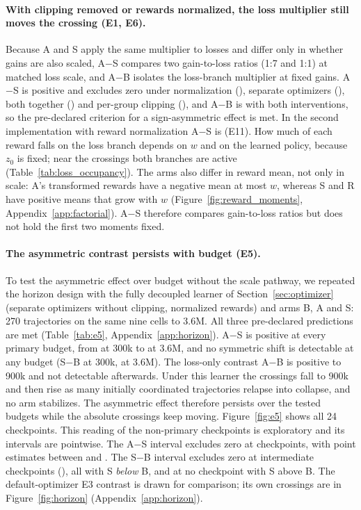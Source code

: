 \paragraph{With clipping removed or rewards normalized, the loss multiplier still moves the crossing (E1, E6).}
Because A and S apply the same multiplier to losses and differ only in whether gains are also scaled, A$-$S
compares two gain-to-loss ratios (1:7 and 1:1) at matched loss scale, and A$-$B isolates the loss-branch
multiplier at fixed gains. A$-$S is positive and excludes zero under normalization (\VfourAsymNorm{}),
separate optimizers (\VfourAsymSep{}), both together (\VfourAsymBoth{}) and per-group clipping
(\VsixAsymGroup{}), and A$-$B is \VfourLossBoth{} with both interventions, so the pre-declared criterion for a
sign-asymmetric effect is met. In the second implementation with reward normalization A$-$S is
\VelevenAsymDefault{} (E11). How much of each reward falls on the loss branch depends on $w$ and on the
learned policy, because $z_0$ is fixed; near the crossings both branches are active
(Table~\ref{tab:loss_occupancy}). The arms also differ in reward mean, not only in scale: A's transformed
rewards have a negative mean at most $w$, whereas S and R have positive means that grow with $w$
(Figure~\ref{fig:reward_moments}, Appendix~\ref{app:factorial}). A$-$S therefore compares gain-to-loss ratios
but does not hold the first two moments fixed.

\paragraph{The asymmetric contrast persists with budget (E5).}
To test the asymmetric effect over budget without the scale pathway, we repeated the horizon design with
the fully decoupled learner of Section~\ref{sec:optimizer} (separate optimizers without clipping,
normalized rewards) and arms B, A and S: 270 trajectories on the same nine cells to 3.6M. All three
pre-declared predictions are met (Table~\ref{tab:e5}, Appendix~\ref{app:horizon}). A$-$S is positive at every primary budget, from
\VfiveAsymStart{} at 300k to \VfiveAsymEnd{} at 3.6M, and no symmetric shift is detectable at any budget
(S$-$B \VfiveSymStart{} at 300k, \VfiveSymEnd{} at 3.6M). The loss-only contrast A$-$B is positive to
900k and not detectable afterwards. Under this learner the crossings fall to 900k and then rise as many
initially coordinated trajectories relapse into collapse, and no arm stabilizes. The asymmetric effect
therefore persists over the tested budgets while the absolute crossings keep moving.
Figure~\ref{fig:e5} shows all 24 checkpoints. This reading of the non-primary checkpoints is exploratory
and its intervals are pointwise. The A$-$S interval excludes zero at \VrevAsymPos{} checkpoints, with
point estimates between \VrevAsymMin{} and \VrevAsymMax{}. The S$-$B interval excludes zero at
\VrevSymNeg{} intermediate checkpoints (\VrevSymNegSpan{}), all with S \emph{below} B, and at no
checkpoint with S above B. The default-optimizer E3 contrast is drawn for comparison; its own crossings
are in Figure~\ref{fig:horizon} (Appendix~\ref{app:horizon}).


